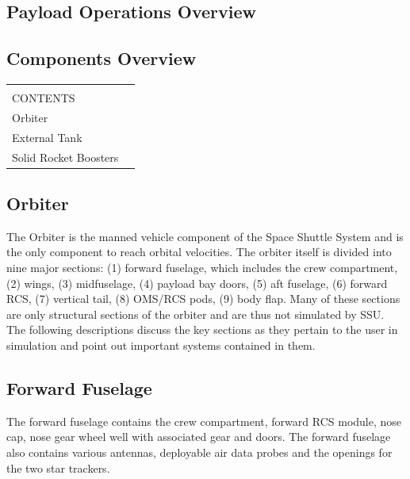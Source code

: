 \documentclass[13pt, letter,final]{article}
\begin{document}
\begin{multicols}{2}
\subsection*{\large Payload Operations Overview}


\newpage
\subsection{\large Components Overview}

\begin{tabular}{|p{7cm} p{0.25cm}|}
	\hline
	&\\[0.1cm]
	CONTENTS & \\[0.4cm]
	Orbiter & \\
	External Tank & \\
	Solid Rocket Boosters & \\
	\hline
\end{tabular}
\subsection*{\large Orbiter}

The Orbiter is the manned vehicle component of the Space Shuttle System and is the only component to reach orbital velocities.  The orbiter itself is divided into nine major sections: (1) forward fuselage, which includes the crew compartment, (2) wings, (3) midfuselage, (4) payload bay doors, (5) aft fuselage, (6) forward RCS, (7) vertical tail, (8) OMS/RCS pods, (9) body flap.  Many of these sections are only structural sections of the orbiter and are thus not simulated by SSU. The following descriptions discuss the key sections as they pertain to the user in simulation and point out important systems contained in them.

\begin{center}
\subsection*{Forward Fuselage}
\end{center}
The forward fuselage contains the crew compartment, forward RCS module, nose cap, nose gear wheel well with associated gear and doors.  The forward fuselage also contains various antennas, deployable air data probes and the openings for the two star trackers.
\\
\begin{center}

\end{center}
\end{multicols}
\end{document}
